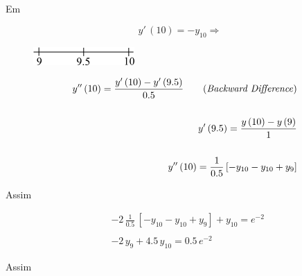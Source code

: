 \\

\\

Em 

\begin{figure}[htb]
 \centering
 \begin{minipage}[c]{3cm}
    \[
     y'\,(10) = -y_{10} \Rightarrow
    \]
 \end{minipage}\hspace*{2cm}
 \begin{minipage}[c]{5cm}
    \includegraphics[scale=1.0]{capitulos/capitulo7/figuras/algo_sol_sist_tri1.png}
    \label{fig:algo_sol_sist_tri1}
 \end{minipage}
\end{figure}

\begin{eqnarray}
 && y''\,(10) = \frac{y'\,(10) - y'\,(9.5)}{0.5} \qquad \mbox{(\textit{Backward Difference})} \nonumber \\
 \nonumber \\
 && y'\,(9.5) = \frac{y\,(10) - y\,(9)}{1} \nonumber \\
 \nonumber \\
 && y''\,(10) = \frac{1}{0.5} \, [-y_{10} - y_{10} + y_9]
\end{eqnarray}

Assim

\begin{eqnarray}
 && -2 \, \frac{1}{0.5} \, [-y_{10} - y_{10} + y_9] + y_{10} = e^{-2} \nonumber \\
 \nonumber \\
 && -2 \, y_9 + 4.5 \, y_{10} = 0.5 \, e^{-2}
\end{eqnarray}

Assim

